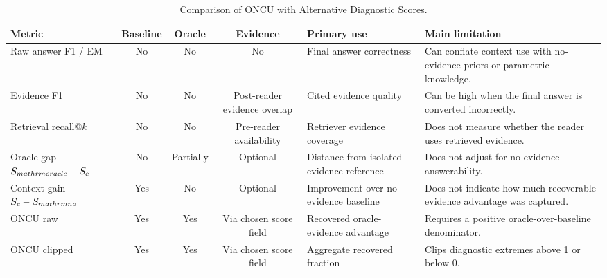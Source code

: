 \begin{table}[!t]
\renewcommand{\arraystretch}{1.08}
\caption{Comparison of ONCU with Alternative Diagnostic Scores.}
\label{tab:metric_comparison_alternatives}
\centering
\scriptsize
\setlength{\tabcolsep}{2.5pt}
\begin{tabular}{lccclp{}}
\toprule
Metric & Baseline & Oracle & Evidence & Primary use & Main limitation \\
\midrule
Raw answer F1 / EM & No & No & No & Final answer correctness & Can conflate context use with no-evidence priors or parametric knowledge. \\
Evidence F1 & No & No & Post-reader evidence overlap & Cited evidence quality & Can be high when the final answer is converted incorrectly. \\
Retrieval recall@$k$ & No & No & Pre-reader availability & Retriever evidence coverage & Does not measure whether the reader uses retrieved evidence. \\
Oracle gap $S_{\\mathrm{oracle}}-S_c$ & No & Partially & Optional & Distance from isolated-evidence reference & Does not adjust for no-evidence answerability. \\
Context gain $S_c-S_{\\mathrm{no}}$ & Yes & No & Optional & Improvement over no-evidence baseline & Does not indicate how much recoverable evidence advantage was captured. \\
ONCU raw & Yes & Yes & Via chosen score field & Recovered oracle-evidence advantage & Requires a positive oracle-over-baseline denominator. \\
ONCU clipped & Yes & Yes & Via chosen score field & Aggregate recovered fraction & Clips diagnostic extremes above 1 or below 0. \\
\bottomrule
\end{tabular}
\end{table}
